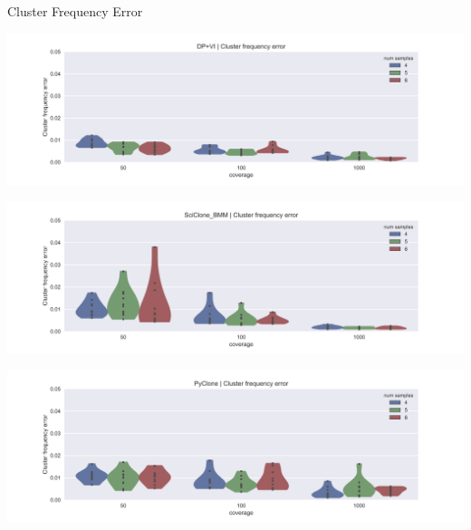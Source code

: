 \documentclass{beamer}
\begin{document}
\begin{frame}{Cluster Frequency Error}
\vspace{-0.05in}
\centerline{\includegraphics[scale=0.27]{images/DPVI_CFE.png}}
\vspace{-0.05in}
\centerline{\includegraphics[scale=0.27]{images/SciClone_CFE.png}}
\vspace{-0.05in}
\centerline{\includegraphics[scale=0.27]{images/PyClone_CFE.png}}
\end{frame}
\end{document}
